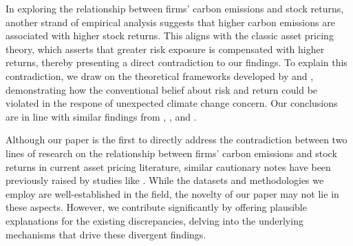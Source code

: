 \documentclass[12pt]{article}
\begin{document}
In exploring the relationship between firms' carbon emissions and stock returns, another strand of empirical analysis suggests that higher carbon emissions are associated with higher stock returns. This aligns with the classic asset pricing theory, which asserts that greater risk exposure is compensated with higher returns, thereby presenting a direct contradiction to our findings. To explain this contradiction, we draw on the theoretical frameworks developed by \citet{koijen2019demand} and \citet{pastor2021sustainable}, demonstrating how the conventional belief about risk and return could be violated in the respone of unexpected climate change concern. Our conclusions are in line with similar findings from \citet{ardia2022climate}, \citet{choi2020attention}, and \citet{engle2020hedging}.

Although our paper is the first to directly address the contradiction between two lines of research on the relationship between firms' carbon emissions and stock returns in current asset pricing literature, similar cautionary notes have been previously raised by studies like \citet{aswani2023carbon}. While the datasets and methodologies we employ are well-established in the field, the novelty of our paper may not lie in these aspects. However, we contribute significantly by offering plausible explanations for the existing discrepancies, delving into the underlying mechanisms that drive these divergent findings.


\begingroup
{}


\endgroup


\end{document}
